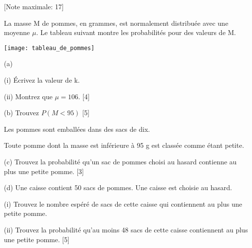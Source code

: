 \begin{question}
  \hspace*{\fill} [Note maximale: 17]\par
  \noindent La masse M de pommes, en grammes, est normalement distribuée avec une moyenne $\mu$. Le tableau suivant montre les probabilités pour des valeurs de M.\par
  \medskip
  \texttt{[image: tableau\_de\_pommes]}\par
  \medskip
  (a)\par
  \medskip
  \hspace{1em}(i)  Écrivez la valeur de k.\par
  \medskip
  \hspace{1em}(ii) Montrez que $\mu = 106$.\hspace*{\fill} [4]\par
  \medskip
  (b) Trouvez $ P(M < 95)$\hspace*{\fill} [5]\par
  \medskip
  \noindent Les pommes sont emballées dans des sacs de dix.\par
  \noindent Toute pomme dont la masse est inférieure à 95 g est classée comme étant petite.\par
  \medskip
  (c) Trouvez la probabilité qu’un sac de pommes choisi au hasard contienne au plus une petite pomme.\hspace*{\fill} [3]\par
  \medskip
  (d) Une caisse contient 50 sacs de pommes. Une caisse est choisie au hasard.\par
  \medskip
  \hspace{1em}(i)  Trouvez le nombre espéré de sacs de cette caisse qui contiennent au plus une petite
pomme.\par  
  \medskip
  \hspace{1em}(ii) Trouvez la probabilité qu’au moins 48 sacs de cette caisse contiennent au plus une petite
pomme.\hspace*{\fill} [5]\par
  \bigskip

\end{question}

